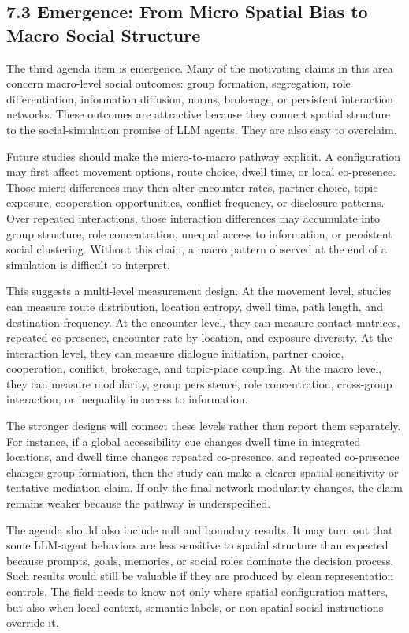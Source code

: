\documentclass[
  twocolumn]{article}
\begin{document}
\subsection{7.3 Emergence: From Micro Spatial Bias to Macro Social
Structure}\label{emergence-from-micro-spatial-bias-to-macro-social-structure}

The third agenda item is emergence. Many of the motivating claims in
this area concern macro-level social outcomes: group formation,
segregation, role differentiation, information diffusion, norms,
brokerage, or persistent interaction networks. These outcomes are
attractive because they connect spatial structure to the
social-simulation promise of LLM agents. They are also easy to
overclaim.

Future studies should make the micro-to-macro pathway explicit. A
configuration may first affect movement options, route choice, dwell
time, or local co-presence. Those micro differences may then alter
encounter rates, partner choice, topic exposure, cooperation
opportunities, conflict frequency, or disclosure patterns. Over repeated
interactions, those interaction differences may accumulate into group
structure, role concentration, unequal access to information, or
persistent social clustering. Without this chain, a macro pattern
observed at the end of a simulation is difficult to interpret.

This suggests a multi-level measurement design. At the movement level,
studies can measure route distribution, location entropy, dwell time,
path length, and destination frequency. At the encounter level, they can
measure contact matrices, repeated co-presence, encounter rate by
location, and exposure diversity. At the interaction level, they can
measure dialogue initiation, partner choice, cooperation, conflict,
brokerage, and topic-place coupling. At the macro level, they can
measure modularity, group persistence, role concentration, cross-group
interaction, or inequality in access to information.

The stronger designs will connect these levels rather than report them
separately. For instance, if a global accessibility cue changes dwell
time in integrated locations, and dwell time changes repeated
co-presence, and repeated co-presence changes group formation, then the
study can make a clearer spatial-sensitivity or tentative mediation
claim. If only the final network modularity changes, the claim remains
weaker because the pathway is underspecified.

The agenda should also include null and boundary results. It may turn
out that some LLM-agent behaviors are less sensitive to spatial
structure than expected because prompts, goals, memories, or social
roles dominate the decision process. Such results would still be
valuable if they are produced by clean representation controls. The
field needs to know not only where spatial configuration matters, but
also when local context, semantic labels, or non-spatial social
instructions override it.
\end{document}
